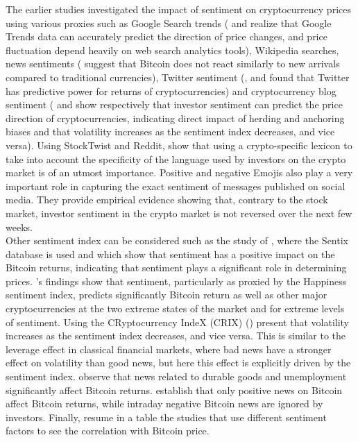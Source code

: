 \documentclass{article}
\begin{document}
	The earlier studies investigated the impact of sentiment on cryptocurrency prices using various proxies such as Google Search trends (\cite{aobpu} and \cite{asmsa} realize that Google Trends data can accurately predict the direction of price changes, and price fluctuation depend heavily on web search analytics tools), Wikipedia searches, news sentiments (\cite{nsitc} suggest that Bitcoin does not react similarly to new arrivals compared to traditional currencies), Twitter sentiment (\cite{tppop}, \cite{cpput} and \cite{prooi} found that Twitter has predictive power for returns of cryptocurrencies) and cryptocurrency blog sentiment (\cite{haaic} and \cite{sibit} show respectively that investor sentiment can predict the price direction of cryptocurrencies, indicating direct impact of herding and anchoring biases and that volatility increases as the sentiment index decreases, and vice versa). Using StockTwist and Reddit, \cite{wmcsi} show that using a crypto-specific lexicon to take into account the specificity of the language used by investors on the crypto market is of an utmost importance. Positive and negative Emojis also play a very important role in capturing the exact sentiment of messages published on social media. They provide empirical evidence showing that, contrary to the stock market, investor sentiment in the crypto market is not reversed over the next few weeks. \\
	Other sentiment index can be considered such as the study of \cite{dsic}, where the Sentix database is used and which show that sentiment has a positive impact on the Bitcoin returns, indicating that sentiment plays a significant role in determining prices. \cite{prooi}'s findings show that sentiment, particularly as proxied by the Happiness sentiment index, predicts significantly Bitcoin return as well as other major cryptocurrencies at the two extreme states of the market and for extreme levels of sentiment. Using the CRyptocurrency IndeX (CRIX) (\cite{sibit}) present that volatility increases as the sentiment index decreases, and vice versa. This is similar to the leverage effect in classical financial markets, where bad news have a stronger effect on volatility than good news, but here this effect is explicitly driven by the sentiment index. \cite{tiomn} observe that  news related to durable goods and unemployment significantly affect Bitcoin returns. \cite{nsitc} establish that only positive news on Bitcoin affect Bitcoin returns, while intraday negative Bitcoin news are ignored by investors. Finally, \cite{pepwm} resume in a table the studies that use different sentiment factors to see the correlation with Bitcoin price. \\
	
\end{document}
